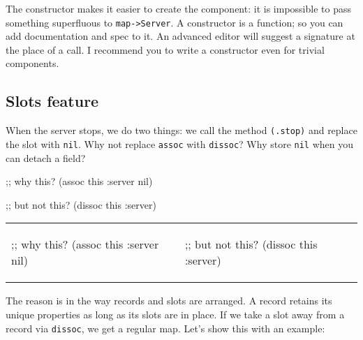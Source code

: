 \fi

The constructor makes it easier to create the component: it is impossible to pass something superfluous to \verb|map->Server|. A constructor is a function; so you can add documentation and spec to it. An advanced editor will suggest a signature at the place of a call. I recommend you to write a constructor even for trivial components.

\subsection{Slots feature}

When the server stops, we do two things: we call the method \verb|(.stop)| and replace the slot with \verb|nil|. Why not replace \verb|assoc| with \verb|dissoc|? Why store \verb|nil| when you can detach a field?

\ifnarrow

\begin{english}
  \begin{clojure}
;; why this?
(assoc this :server nil)
  \end{clojure}

\splitter

  \begin{clojure}
;; but not this?
(dissoc this :server)
  \end{clojure}
\end{english}

\else

\begin{english}

\noindent
\begin{tabular}{ @{}p{5cm} @{}p{5cm} }

  \begin{clojure}
;; why this?
(assoc this :server nil)
  \end{clojure}

&

  \begin{clojure}
;; but not this?
(dissoc this :server)
  \end{clojure}

\end{tabular}

\end{english}

\fi

The reason is in the way records and slots are arranged. A record retains its unique properties as long as its slots are in place. If we take a slot away from a record via \verb|dissoc|, we get a regular map. Let's show this with an example:

